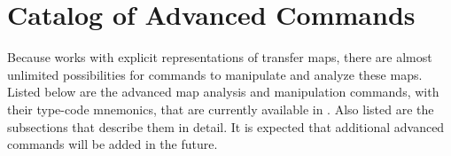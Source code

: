 
\chapter{Catalog of Advanced Commands}
     Because \Mary works with explicit representations of transfer maps, there are almost unlimited possibilities for commands to manipulate and analyze these maps.  Listed below are the advanced map analysis and manipulation commands, with their type-code mnemonics, that are currently available in .  Also listed are the subsections that describe them in detail.  It is expected that additional advanced commands will be added in the future. 

